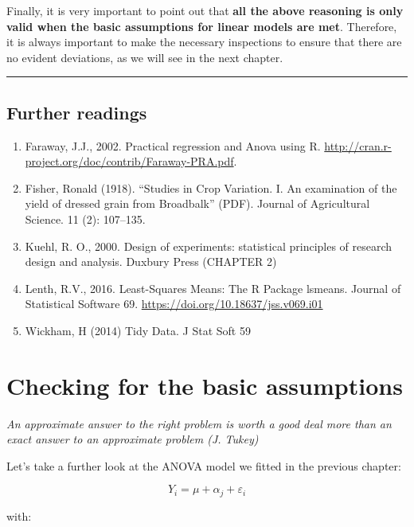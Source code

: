 \documentclass[a4paper,12pt,oneside]{book}
\providecommand{\tightlist}{%
  \setlength{\itemsep}{0pt}\setlength{\parskip}{0pt}}
\begin{document}
Finally, it is very important to point out that \textbf{all the above reasoning is only valid when the basic assumptions for linear models are met}. Therefore, it is always important to make the necessary inspections to ensure that there are no evident deviations, as we will see in the next chapter.

\begin{center}\rule{0.5\linewidth}{0.5pt}\end{center}

\hypertarget{further-readings-5}{%
\section{Further readings}\label{further-readings-5}}

\begin{enumerate}
\def\labelenumi{\arabic{enumi}.}
\tightlist
\item
  Faraway, J.J., 2002. Practical regression and Anova using R. \url{http://cran.r-project.org/doc/contrib/Faraway-PRA.pdf}.
\item
  Fisher, Ronald (1918). ``Studies in Crop Variation. I. An examination of the yield of dressed grain from Broadbalk'' (PDF). Journal of Agricultural Science. 11 (2): 107--135.
\item
  Kuehl, R. O., 2000. Design of experiments: statistical principles of research design and analysis. Duxbury Press (CHAPTER 2)
\item
  Lenth, R.V., 2016. Least-Squares Means: The R Package lsmeans. Journal of Statistical Software 69. \url{https://doi.org/10.18637/jss.v069.i01}
\item
  Wickham, H (2014) Tidy Data. J Stat Soft 59
\end{enumerate}

\hypertarget{checking-for-the-basic-assumptions}{%
\chapter{Checking for the basic assumptions}\label{checking-for-the-basic-assumptions}}

\emph{An approximate answer to the right problem is worth a good deal more than an exact answer to an approximate problem (J. Tukey)}

Let's take a further look at the ANOVA model we fitted in the previous chapter:

\[Y_i = \mu + \alpha_j + \varepsilon_i\]

with:
\end{document}

